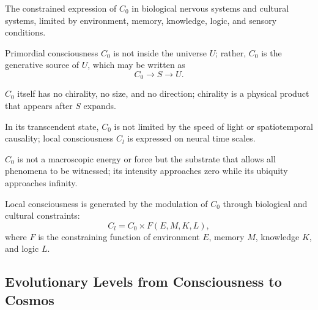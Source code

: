 \documentclass[11pt,a4paper]{article}
\begin{document}
\begin{definition}
The constrained expression of $C_0$ in biological nervous systems and cultural systems, limited by environment, memory, knowledge, logic, and sensory conditions.
\end{definition}

\begin{postulate}[Transcendence]
Primordial consciousness $C_0$ is not inside the universe $U$; rather, $C_0$ is the generative source of $U$, which may be written as
\begin{equation}
C_0 \rightarrow S \rightarrow U.
\end{equation}
\end{postulate}

\begin{postulate}
$C_0$ itself has no chirality, no size, and no direction; chirality is a physical product that appears after $S$ expands.
\end{postulate}

\begin{postulate}
In its transcendent state, $C_0$ is not limited by the speed of light or spatiotemporal causality; local consciousness $C_l$ is expressed on neural time scales.
\end{postulate}

\begin{postulate}[Subtlety]
$C_0$ is not a macroscopic energy or force but the substrate that allows all phenomena to be witnessed; its intensity approaches zero while its ubiquity approaches infinity.
\end{postulate}

\begin{postulate}
Local consciousness is generated by the modulation of $C_0$ through biological and cultural constraints:
\begin{equation}
C_l = C_0 \times F(E, M, K, L),
\end{equation}
where $F$ is the constraining function of environment $E$, memory $M$, knowledge $K$, and logic $L$.
\end{postulate}

\subsection{Evolutionary Levels from Consciousness to Cosmos}
\end{document}
